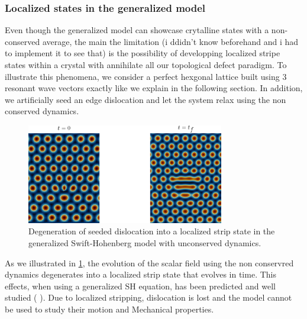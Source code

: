 \documentclass{article}
\begin{document}
\subsubsection{Localized states in the generalized model}
Even though the generalized model can showcase crytalline states with a non-conserved average, the main the limitation (i ddidn't know beforehand and i had to implement it to see that) is the possibility of developping localized stripe states within a crystal with annihilate all our topological defect paradigm. To illustrate this phenomena, we consider a perfect hexgonal lattice built using 3 resonant wave vectors exactly like we explain in the following section. In addition, we artificially seed an edge dislocation and let the system relax using the non conserved dynamics.
\begin{figure}[H]
   \centering
   \includegraphics[width=0.77\textwidth]{imgs/weakcoupling/dipole/localization.png}
   \caption{Degeneration of seeded dislocation into a localized strip state in the generalized Swift-Hohenberg model with unconserved dynamics.}\label{fig:localization}
\end{figure}
As we illustrated in \cref{fig:localization}, the evolution of the scalar field using the non conservred dynamics degenerates into a localized strip state that evolves in time. This effects, when using a generalized SH equation, has been predicted and well studied (\cite{thieleLocalizedStatesConserved2013} \cite{burkeLocalizedStatesGeneralized2006}). Due to localized stripping, dislocation is lost and the model cannot be used to study their motion and Mechanical properties.\\
\end{document}
